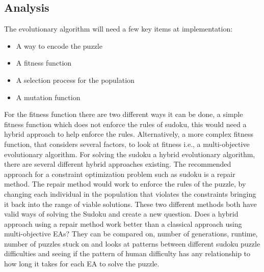 \documentclass[a4paper,11pt]{article}
\begin{document}
\subsection{Analysis}
The evolutionary algorithm will need a few key items at implementation:
\begin{itemize}
	\item A way to encode the puzzle
	\item A fitness function
	\item A selection process for the population
	\item A mutation function
\end{itemize}
For the fitness function there are two different ways it can be done, a simple fitness function which does not enforce the rules of sudoku, this would need a hybrid approach to help enforce the rules. Alternatively, a more complex fitness function, that considers several factors, to look at fitness i.e., a multi-objective evolutionary algorithm.\newline \newline
For solving the sudoku a hybrid evolutionary algorithm, there are several different hybrid approaches existing\cite{constraintReview}. The recommended approach for a constraint optimization problem such as sudoku is a repair method. The repair method would work to enforce the rules of the puzzle, by changing each individual in the population that violates the constraints bringing it back into the range of viable solutions.\newline \newline
These two different methods both have valid ways of solving the Sudoku and create a new question. Does a hybrid approach using a repair method work better than a classical approach using multi-objective EAs? They can be compared on, number of generations, runtime, number of puzzles stuck on and looks at patterns between different sudoku puzzle difficulties and seeing if the pattern of human difficulty has any relationship to how long it takes for each EA to solve the puzzle.
\end{document}
